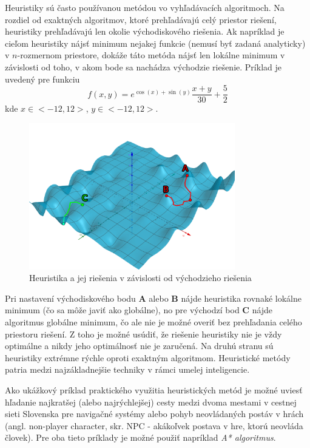 Heuristiky sú často používanou metódou vo vyhľadávacích algoritmoch.\cite{heuristic}
Na rozdiel od exaktných algoritmov, ktoré prehľadávajú celý priestor riešení, heuristiky prehľadávajú len okolie
východiskového riešenia.
Ak napríklad je cieľom heuristiky nájsť minimum nejakej funkcie (nemusí byť zadaná analyticky) v $n$-rozmernom priestore,
dokáže táto metóda nájsť len lokálne minimum v závislosti od toho, v akom bode sa nachádza východzie riešenie.
Príklad je uvedený pre funkciu
\begin{equation}
    f(x,y)=e^{\cos(x)+\sin(y)}\frac{x+y}{30}+\frac{5}{2}
\end{equation}
kde $x\in<-12,12>$, $y\in<-12,12>$.
\begin{figure}[H]
    \centering
    \includegraphics[width=0.8\textwidth]{images/heuristic.png}
    \caption{Heuristika a jej riešenia v závislosti od východzieho riešenia}
\end{figure}\label{figure:heuristic-method}
Pri nastavení východiskového bodu \textbf{A} alebo \textbf{B} nájde heuristika rovnaké lokálne minimum (čo sa môže javiť
ako globálne), no pre východzí bod \textbf{C} nájde algoritmus globálne minimum, čo ale nie je možné overiť bez
prehľadania celého priestoru riešení.
Z toho je možné usúdiť, že riešenie heuristiky nie je vždy optimálne a nikdy jeho optimálnosť nie je zaručená.
Na druhú stranu sú heuristiky extrémne rýchle oproti exaktným algoritmom.
Heuristické metódy patria medzi najzákladnejšie techniky v rámci umelej inteligencie.

Ako ukážkový príklad praktického využitia heuristických metód je možné uviesť hľadanie najkratšej (alebo najrýchlejšej)
cesty medzi dvoma mestami v cestnej sieti Slovenska pre navigačné systémy alebo pohyb neovládaných postáv v hrách
(angl. non-player character, skr. NPC - akákoľvek postava v hre, ktorú neovláda človek).
Pre oba tieto príklady je možné použiť napríklad \emph{A* algoritmus}.\cite{heuristic}

